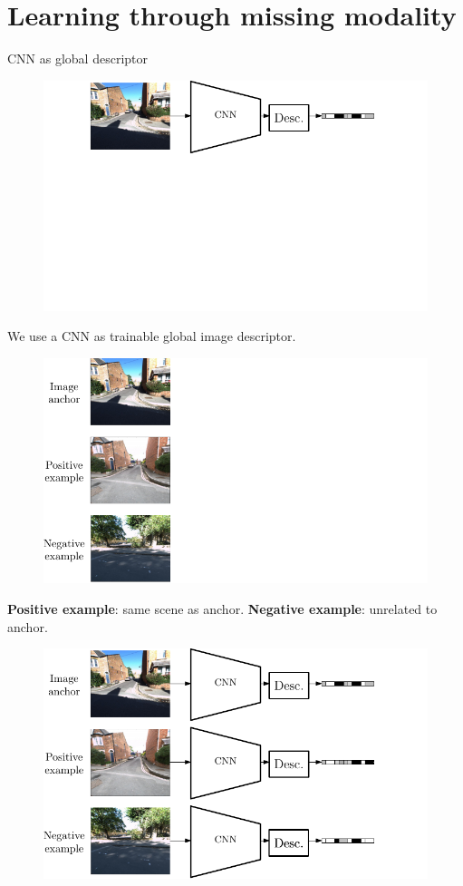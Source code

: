 \section{Learning through missing modality}

\label{sec:method}

\begin{frame}{CNN as global descriptor}
	\only<1>
	{
	\begin{figure}
	\centering
	\includegraphics[width=0.7\linewidth]{vect/method/fig2/0n}
	\end{figure}
	\vfill
	\vspace{-1.0cm}
	We use a CNN as trainable global image descriptor.
	}
	{
	\begin{figure}
	\centering
	\includegraphics[width=0.7\linewidth]{vect/method/fig2/1}
	\end{figure}
	\vfill
	\textbf{Positive example}: same scene as anchor. \textbf{Negative example}: unrelated to anchor.
	}
	{
	\begin{figure}
	\centering
	\includegraphics[width=0.7\linewidth]{vect/method/fig2/2n}	

\end{figure}}
\end{frame}
